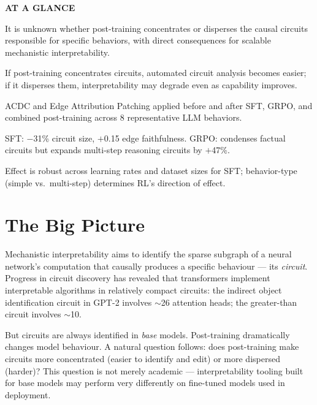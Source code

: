 \documentclass[10pt,twocolumn]{article}
\begin{document}
\begin{mdframed}[backgroundcolor=boxgray,linecolor=rulered,linewidth=1pt,
    innerleftmargin=6pt,innerrightmargin=6pt,
    innertopmargin=6pt,innerbottommargin=6pt]
\textbf{\small AT A GLANCE}\par\vspace{4pt}
\begin{description}[leftmargin=0pt,labelsep=4pt,itemsep=2pt,parsep=0pt,
    font=\small\bfseries]
  \item[Problem:] It is unknown whether post-training concentrates or
    disperses the causal circuits responsible for specific behaviors,
    with direct consequences for scalable mechanistic interpretability.
  \item[Why it matters:] If post-training concentrates circuits,
    automated circuit analysis becomes easier; if it disperses them,
    interpretability may degrade even as capability improves.
  \item[Method:] ACDC and Edge Attribution Patching applied before and
    after SFT, GRPO, and combined post-training across 8 representative
    LLM behaviors.
  \item[Result:] SFT: $-$31\% circuit size, $+$0.15 edge faithfulness.
    GRPO: condenses factual circuits but expands multi-step reasoning
    circuits by $+$47\%.
  \item[Evidence:] Effect is robust across learning rates and dataset
    sizes for SFT; behavior-type (simple vs.\ multi-step) determines
    RL's direction of effect.
\end{description}
\end{mdframed}

\section{The Big Picture}

Mechanistic interpretability aims to identify the sparse subgraph
of a neural network's computation that causally produces a specific
behaviour — its \emph{circuit}. Progress in circuit discovery has
revealed that transformers implement interpretable algorithms in
relatively compact circuits: the indirect object identification
circuit in GPT-2 involves $\sim$26 attention heads; the greater-than
circuit involves $\sim$10.

But circuits are always identified in \emph{base} models. Post-training
dramatically changes model behaviour. A natural question follows:
does post-training make circuits more concentrated (easier to identify
and edit) or more dispersed (harder)? This question is not merely
academic — interpretability tooling built for base models may
perform very differently on fine-tuned models used in deployment.
\end{document}
